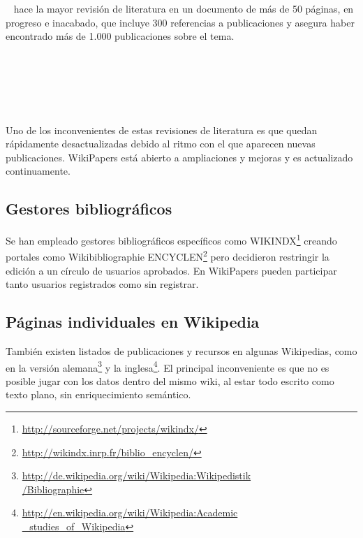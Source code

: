 \documentclass[11pt,twocolumn]{article}
\begin{document}
~\citep{nielsen2011} hace la mayor revisión de literatura en un documento de más de 50 páginas, en progreso e inacabado, que incluye 300 referencias a publicaciones y asegura haber encontrado más de 1.000 publicaciones sobre el tema.

~\citep{martin2011}

~\citep{okoli2012}

~\citep{jullien2012}

Uno de los inconvenientes de estas revisiones de literatura es que quedan rápidamente desactualizadas debido al ritmo con el que aparecen nuevas publicaciones. WikiPapers está abierto a ampliaciones y mejoras y es actualizado continuamente.

\subsection{Gestores bibliográficos}
Se han empleado gestores bibliográficos específicos como WIKINDX\footnote{\href{http://sourceforge.net/projects/wikindx/}{http://sourceforge.net/projects/wikindx/}} creando portales como Wikibibliographie ENCYCLEN\footnote{\href{http://wikindx.inrp.fr/biblio_encyclen/}{http://wikindx.inrp.fr/biblio\_encyclen/}} pero decidieron restringir la edición a un círculo de usuarios aprobados. En WikiPapers pueden participar tanto usuarios registrados como sin registrar.


\subsection{Páginas individuales en Wikipedia}
También existen listados de publicaciones y recursos en algunas Wikipedias, como en la versión alemana\footnote{\href{http://de.wikipedia.org/wiki/Wikipedia:Wikipedistik/Bibliographie}{http://de.wikipedia.org/wiki/Wikipedia:Wikipedistik\\ /Bibliographie}} y la inglesa\footnote{\href{http://en.wikipedia.org/wiki/Wikipedia:Academic_studies_of_Wikipedia}{http://en.wikipedia.org/wiki/Wikipedia:Academic\\ \_studies\_of\_Wikipedia}}. El principal inconveniente es que no es posible jugar con los datos dentro del mismo wiki, al estar todo escrito como texto plano, sin enriquecimiento semántico.
\end{document}
